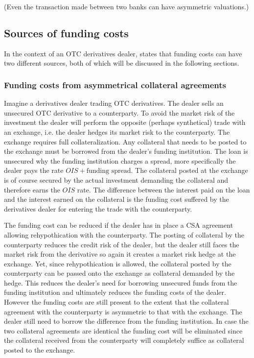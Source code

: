 \documentclass[../main.tex]{subfiles}
\begin{document}
        (Even the transaction made between two banks can have asymmetric valuations.)

    \subsection{Sources of funding costs}
        In the context of an OTC derivatives dealer,
        \cite{Ruiz2013FVA} states that funding costs can have two different sources,
        both of which will be discussed in the following sections. 

    \subsubsection{Funding costs from asymmetrical collateral agreements}
        Imagine a derivatives dealer trading OTC derivatives.
        The dealer sells an unsecured OTC derivative to a counterparty.
        To avoid the market risk of the investment the dealer will perform the opposite (perhaps synthetical) trade with an exchange,
        i.e. the dealer hedges its market risk to the counterparty.
        The exchange requires full collateralization.
        Any collateral that needs to be posted to the exchange must be borrowed from the dealer's funding institution.
        The loan is unsecured why the funding institution charges a spread,
        more specifically the dealer pays the rate $OIS + \text{funding spread}$.
        The collateral posted at the exchange is of course secured by the actual investment demanding the collateral and therefore earns the $OIS$ rate.
        The difference between the interest paid on the loan and the interest earned on the collateral is the funding cost suffered by the derivatives dealer for entering the trade with the counterparty. 

        The funding cost can be reduced if the dealer has in place a CSA agreement allowing rehypothication with the counterparty.
        The posting of collateral by the counterparty reduces the credit risk of the dealer,
        but the dealer still faces the market risk from the derivative so again it creates a market risk hedge at the exchange.
        Yet, since rehypothication is allowed,
        the collateral posted by the counterparty can be passed onto the exchange as collateral demanded by the hedge.
        This reduces the dealer's need for borrowing unsecured funds from the funding institution and ultimately reduces the funding costs of the dealer.
        However the funding costs are still present to the extent that the collateral agreement with the counterparty is asymmetric to that with the exchange.
        The dealer still need to borrow the difference from the funding institution.
        In case the two collateral agreements are identical the funding cost will be eliminated since the collateral received from the counterparty will completely suffice as collateral posted to the exchange.
\end{document}
